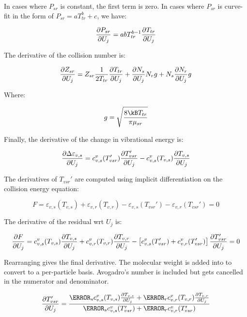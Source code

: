 \documentclass[10pt]{article}
\begin{document}
\begin{flushleft}
In cases where $P_{sr}$ is constant, the first term is zero. In cases where $P_{sr}$ is curve-fit in the form of $P_{sr} = a T_{tr}^b + c$, we have:\

\begin{equation}
    \frac{\partial P_{sr}}{\partial U_j} = a b T_{tr}^{b-1} \frac{\partial T_{tr}}{\partial U_j}
\end{equation}

The derivative of the collision number is:

\begin{equation}
    \frac{\partial Z_{sr}}{\partial U_j} = Z_{sr} \frac{1}{2 T_{tr}} \frac{\partial T_{tr}}{\partial U_j} + \frac{\partial N_s}{\partial U_j} N_r g + N_s \frac{\partial N_r}{\partial U_j} g
\end{equation}

Where:

\begin{equation}
    g = \sqrt{\frac{8 \kB T_{tr}}{\pi \mu_{sr}}}
\end{equation}

Finally, the derivative of the change in vibrational energy is:

\begin{equation}
    \frac{\partial \Delta \varepsilon_{v,s}}{\partial U_j} = c_{v,s}^v (T_{vsr}') \frac{\partial T_{vsr}'}{\partial U_j} - c_{v,s}^v (T_{v,s}) \frac{\partial T_{v,s}}{\partial U_j}
\end{equation}

The derivatives of $T_{vsr}'$ are computed using implicit differentiation on the collision energy equation:

\begin{equation}
    F = \varepsilon_{v,s} (T_{v,s}) + \varepsilon_{v,r} (T_{v,r}) - \varepsilon_{v,s} (T_{vsr}') - \varepsilon_{v,r} (T_{vsr}') = 0
\end{equation}

The derivative of the residual wrt $U_j$ is:

\begin{equation}
    \frac{\partial F}{\partial U_j} = c_{v,s}^v (T_{v,s}) \frac{\partial T_{v,s}}{\partial U_j} + c_{v,r}^v (T_{v,r}) \frac{\partial T_{v,r}}{\partial U_j} - \left[ c_{v,s}^v (T_{vsr}') + c_{v,r}^v (T_{vsr}') \right] \frac{\partial T_{vsr}'}{\partial U_j} = 0
\end{equation}

Rearranging gives the final derivative. The molecular weight is added into to convert to a per-particle basis. Avogadro's number is included but gets cancelled in the numerator and denominator.

\begin{equation}
    \pd{T_{vsr}'}{U_j} = \frac{\MW_s c_{v,s}^v (T_{v,s}) \pd{T_{v,s}}{U_j} + \MW_r c_{v,r}^v (T_{v,r}) \pd{T_{v,r}}{U_j}}{\MW_s c_{v,s}^v (T_{vsr}') + \MW_r c_{v,r}^v (T_{vsr}')}
\end{equation}


\end{flushleft}
\end{document}
